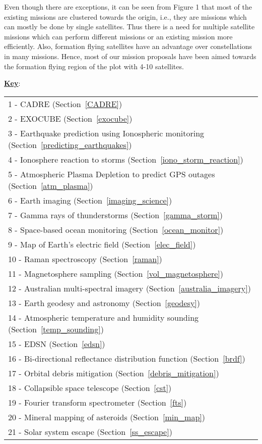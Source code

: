 Even though there are exceptions, it can be seen from Figure 1 that most of the existing missions are clustered towards the origin, i.e., they are missions which can mostly be done by single satellites. Thus there is a need for multiple satellite missions which can perform different missions or an existing mission more efficiently. Also, formation flying satellites have an advantage over constellations in many missions. Hence, most of our mission proposals have been aimed towards the formation flying region of the plot with 4-10 satellites.  


\newpage
{\bf \underline {Key}}: \\

\begin{tabular}{p{20cm}}
 1 - CADRE (Section~\ref{CADRE}) \\
 2 - EXOCUBE (Section~\ref{exocube}) \\
 3 - Earthquake prediction using Ionospheric monitoring (Section~\ref{predicting_earthquakes}) \\
 4 - Ionosphere reaction to storms (Section~\ref{iono_storm_reaction}) \\
 5 - Atmospheric Plasma Depletion to predict GPS outages (Section~\ref{atm_plasma}) \\
 6 - Earth imaging (Section~\ref{imaging_science}) \\
 7 - Gamma rays of thunderstorms (Section~\ref{gamma_storm}) \\
 8 - Space-based ocean monitoring (Section~\ref{ocean_monitor}) \\
 9 - Map of Earth's electric field (Section~\ref{elec_field}) \\
10 - Raman spectroscopy (Section~\ref{raman}) \\
11 - Magnetosphere sampling (Section~\ref{vol_magnetosphere}) \\
12 - Australian multi-spectral imagery (Section~\ref{australia_imagery}) \\
13 - Earth geodesy and astronomy (Section~\ref{geodesy}) \\
14 - Atmospheric temperature and humidity sounding (Section~\ref{temp_sounding}) \\
15 - EDSN (Section~\ref{edsn}) \\
16 - Bi-directional reflectance distribution function (Section~\ref{brdf}) \\
17 - Orbital debris mitigation (Section~\ref{debris_mitigation}) \\
18 - Collapsible space telescope (Section~\ref{cst}) \\
19 - Fourier transform spectrometer (Section~\ref{fts}) \\
20 - Mineral mapping of asteroids (Section~\ref{min_map}) \\
21 - Solar system escape (Section~\ref{ss_escape}) \\
\end{tabular}
